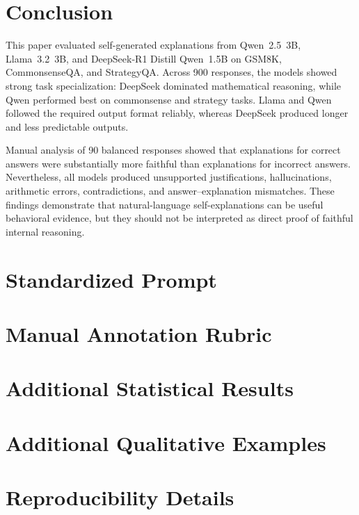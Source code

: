\documentclass{article}
\begin{document}
\section{Conclusion}

This paper evaluated self-generated explanations from Qwen~2.5~3B, Llama~3.2~3B, and DeepSeek-R1 Distill Qwen~1.5B on GSM8K, CommonsenseQA, and StrategyQA. Across 900 responses, the models showed strong task specialization: DeepSeek dominated mathematical reasoning, while Qwen performed best on commonsense and strategy tasks. Llama and Qwen followed the required output format reliably, whereas DeepSeek produced longer and less predictable outputs.

Manual analysis of 90 balanced responses showed that explanations for correct answers were substantially more faithful than explanations for incorrect answers. Nevertheless, all models produced unsupported justifications, hallucinations, arithmetic errors, contradictions, and answer--explanation mismatches. These findings demonstrate that natural-language self-explanations can be useful behavioral evidence, but they should not be interpreted as direct proof of faithful internal reasoning.







\appendix

\section{Standardized Prompt}
\label{app:prompt}

\section{Manual Annotation Rubric}
\label{app:rubric}

\section{Additional Statistical Results}
\label{app:statistics}

\section{Additional Qualitative Examples}
\label{app:examples}

\section{Reproducibility Details}
\label{app:reproducibility}
\end{document}
